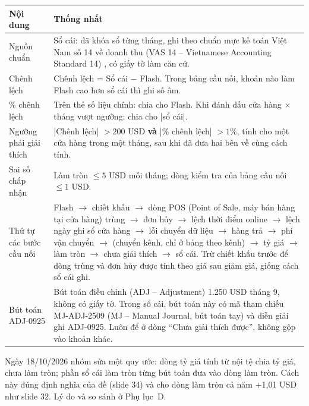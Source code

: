 \label{tab:quyuoc}\nopagebreak[4]
\begin{longtable}{@{}L{4.2cm} L{10.8cm}@{}}
\toprule
Nội dung & Thống nhất \\
\midrule
\endhead
Nguồn chuẩn & Sổ cái: đã khóa sổ từng tháng, ghi theo chuẩn mực kế toán Việt Nam số 14 về doanh thu (VAS 14 -- Vietnamese Accounting Standard 14) \cite{vas14}, có giấy tờ làm căn cứ. \\
Chênh lệch & Chênh lệch = Sổ cái $-$ Flash. Trong bảng cầu nối, khoản nào làm Flash cao hơn sổ cái thì ghi số âm. \\
\% chênh lệch & Trên thẻ số liệu chính: chia cho Flash. Khi đánh dấu cửa hàng $\times$ tháng vượt ngưỡng: chia cho |sổ cái|. \\
Ngưỡng phải giải thích & |Chênh lệch| $> 200$ USD \textbf{và} |\% chênh lệch| $> 1\%$, tính cho một cửa hàng trong một tháng, sau khi đã đưa hai bên về cùng cách tính. \\
Sai số chấp nhận & Làm tròn $\le 5$ USD mỗi tháng; dòng kiểm tra của bảng cầu nối $\le 1$ USD. \\
Thứ tự các bước cầu nối & Flash $\rightarrow$ chiết khấu $\rightarrow$ dòng POS (Point of Sale, máy bán hàng tại cửa hàng) trùng $\rightarrow$ đơn hủy $\rightarrow$ lệch thời điểm online $\rightarrow$ lệch ngày ghi sổ cửa hàng $\rightarrow$ lỗi chuyển dữ liệu $\rightarrow$ hàng trả $\rightarrow$ phí vận chuyển $\rightarrow$ (chuyển kênh, chỉ ở bảng theo kênh) $\rightarrow$ tỷ giá $\rightarrow$ làm tròn $\rightarrow$ chưa giải thích $\rightarrow$ sổ cái. Trừ chiết khấu trước để dòng trùng và đơn hủy được tính theo giá sau giảm giá, giống cách sổ cái ghi. \\
Bút toán ADJ-0925 & Bút toán điều chỉnh (ADJ -- Adjustment) 1.250 USD tháng 9, không có giấy tờ. Trong sổ cái, bút toán này có mã tham chiếu MJ-ADJ-2509 (MJ -- Manual Journal, bút toán tay) và diễn giải ghi ADJ-0925. Luôn để ở dòng ``Chưa giải thích được'', không gộp vào khoản khác. \\
\bottomrule
\end{longtable}

\begin{notebox}
Ngày 18/10/2026 nhóm sửa một quy ước: dòng tỷ giá tính từ nội tệ chia tỷ giá, chưa làm tròn; phần sổ cái làm tròn từng bút toán đưa vào dòng làm tròn. Cách này đúng định nghĩa của đề (slide 34) và cho dòng làm tròn cả năm +1,01 USD như slide 32. Lý do và so sánh ở Phụ lục~D.
\end{notebox}
